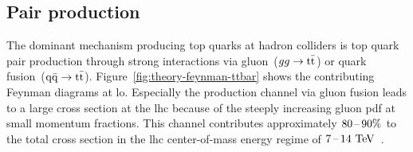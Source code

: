 \subsection{Pair production}

The dominant mechanism producing top quarks at hadron colliders is top quark pair production through strong interactions via gluon~($gg\to\mathrm{t}\bar{\mathrm{t}}$) or quark fusion~($\mathrm{q}\bar{\mathrm{q}}\to\mathrm{t}\bar{\mathrm{t}}$). Figure~\ref{fig:theory-feynman-ttbar} shows the contributing Feynman diagrams at \gls{lo}. Especially the production channel via gluon fusion leads to a large cross section at the \gls{lhc} because of the steeply increasing gluon \gls{pdf} at small momentum fractions. This channel contributes approximately $80\,\text{--}\,90\%$ to the total cross section in the \gls{lhc} center-of-mass energy regime of $7\,\text{--}\,14~\mathrm{TeV}$~\cite{Olive:2016xmw}. 


